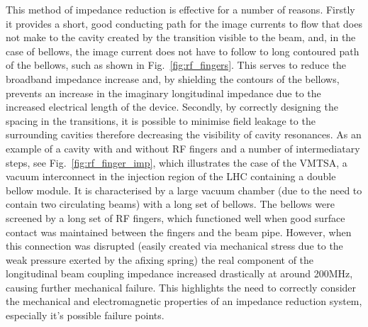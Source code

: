 This method of impedance reduction is effective for a number of reasons. Firstly it provides a short, good conducting path for the image currents to flow that does not make to the cavity created by the transition visible to the beam, and, in the case of bellows, the image current does not have to follow to long contoured path of the bellows, such as shown in Fig.~\ref{fig:rf_fingers}. This serves to reduce the broadband impedance increase and, by shielding the contours of the bellows, prevents an increase in the imaginary longitudinal impedance due to the increased electrical length of the device. Secondly, by correctly designing the spacing in the transitions, it is possible to minimise field leakage to the surrounding cavities therefore decreasing the visibility of cavity resonances. As an example of a cavity with and without RF fingers and a number of intermediatary steps, see Fig.~\ref{fig:rf_finger_imp}, which illustrates the case of the VMTSA, a vacuum interconnect in the injection region of the LHC \cite{Salvant:VMTSA} containing a double bellow module. It is characterised by a large vacuum chamber (due to the need to contain two circulating beams) with a long set of bellows. The bellows were screened by a long set of RF fingers, which functioned well when good surface contact was maintained between the fingers and the beam pipe. However, when this connection was disrupted (easily created via mechanical stress due to the weak pressure exerted by the afixing spring) the real component of the longitudinal beam coupling impedance increased drastically at around 200MHz, causing further mechanical failure. This highlights the need to correctly consider the mechanical and electromagnetic properties of an impedance reduction system, especially it's possible failure points.


